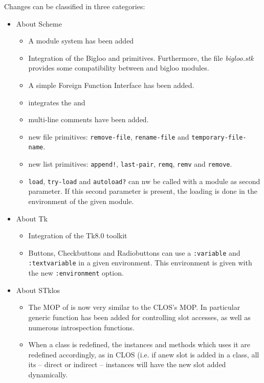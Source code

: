 Changes can be classified in three categories:
\begin{itemize}
\item About Scheme
  \begin{itemize}
  \item A module system has been added
    
  \item Integration of the Bigloo  and
     primitives. Furthermore, the file \emph{bigloo.stk}
    provides some compatibility between {\stk} and bigloo modules.

  \item A simple Foreign Function Interface has been added. 
    
  \item integrates the {\rfive}  and 

  \item multi-line comments have been added.
    
  \item new file primitives: \texttt{remove-file}, \texttt{rename-file} and 
    \texttt{temporary-file-name}.
    
  \item new list primitives: \texttt{append!}, \texttt{last-pair},
    \texttt{remq}, \texttt{remv} and \texttt{remove}.

  \item \texttt{load}, \texttt{try-load} and \texttt{autoload?} can nw
    be called with a module as second parameter. If this second parameter is
    present, the loading is done in the environment of the given module.
  \end{itemize}

\item About Tk
  \begin{itemize}
  \item Integration of the Tk8.0 toolkit
  \item Buttons, Checkbuttons and Radiobuttons can use a
    \texttt{:variable} and \texttt{:textvariable} in a given
    environment. This environment is given with the new \texttt{:environment}
    option.
  \end{itemize}

\item About STklos
  \begin{itemize}
  \item The MOP of {\stklos} is now very similar to the CLOS's MOP. In
    particular generic function has been added for controlling slot
    accesses, as well as numerous introspection functions.
  \item  When a class is redefined, the instances and methods which uses it
    are redefined accordingly, as in CLOS (i.e. if anew slot is added in a
    class, all its -- direct or indirect -- instances will have the new
    slot added dynamically. 
  \end{itemize}
\end{itemize}


